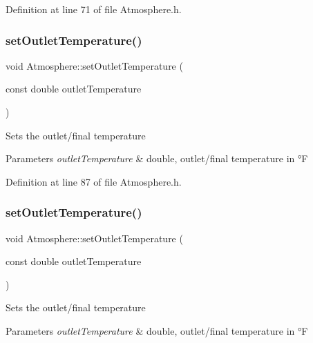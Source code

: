 Definition at line 71 of file Atmosphere.\+h.

\mbox{\label{class_atmosphere_a8f6589ab4e17d3c531bb7e0e771f4f80}} 
\subsubsection{\texorpdfstring{set\+Outlet\+Temperature()}{setOutletTemperature()}\hspace{0.1cm}{\footnotesize\ttfamily [1/3]}}
{\footnotesize\ttfamily void Atmosphere\+::set\+Outlet\+Temperature (\begin{DoxyParamCaption}\item[{const double}]{outlet\+Temperature }\end{DoxyParamCaption})\hspace{0.3cm}{\ttfamily [inline]}}

Sets the outlet/final temperature 
\begin{DoxyParams}{Parameters}
{\em outlet\+Temperature} & double, outlet/final temperature in °F \\
\hline
\end{DoxyParams}


Definition at line 87 of file Atmosphere.\+h.

\mbox{\label{class_atmosphere_a8f6589ab4e17d3c531bb7e0e771f4f80}} 
\subsubsection{\texorpdfstring{set\+Outlet\+Temperature()}{setOutletTemperature()}\hspace{0.1cm}{\footnotesize\ttfamily [2/3]}}
{\footnotesize\ttfamily void Atmosphere\+::set\+Outlet\+Temperature (\begin{DoxyParamCaption}\item[{const double}]{outlet\+Temperature }\end{DoxyParamCaption})\hspace{0.3cm}{\ttfamily [inline]}}

Sets the outlet/final temperature 
\begin{DoxyParams}{Parameters}
{\em outlet\+Temperature} & double, outlet/final temperature in °F \\
\hline
\end{DoxyParams}


